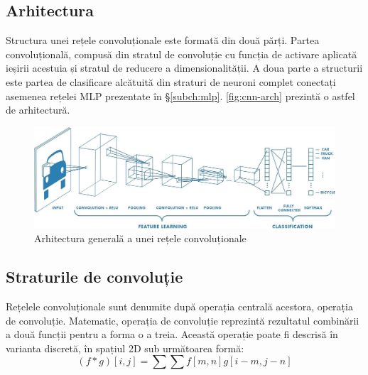 \subsection*{Arhitectura}
Structura unei rețele convoluționale este formată din două părți.
Partea convoluțională, compusă din stratul de convoluție cu funcția de activare aplicată ieșirii acestuia și stratul de reducere a dimensionalității. A doua parte a structurii este partea de clasificare alcătuită din straturi de neuroni complet conectați asemenea rețelei MLP prezentate în \S\ref{subch:mlp}. \autoref{fig:cnn-arch} prezintă o astfel de arhitectură.
\begin{figure}[ht]
\centering
\includegraphics[width=\textwidth]{fig/cap2/cnn-arch.jpeg}
\caption{Arhitectura generală a unei rețele convoluționale}
\label{fig:cnn-arch}
\end{figure}

\subsection*{Straturile de convoluție}
Rețelele convoluționale sunt denumite după operația centrală acestora, operația de convoluție. Matematic, operația de convoluție reprezintă rezultatul combinării a două funcții pentru a forma o a treia. Această operație poate fi descrisă în varianta discretă, în spațiul 2D sub următoarea formă:
\begin{equation}
(f*g)[i,j]=\sum\sum f[m,n]g[i-m,j-n]
\label{eq:conv-dis-2D}
\end{equation}

